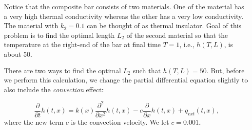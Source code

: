 \documentclass[11pt,a4paper]{article}
\newcommand{\p}{\partial }
\begin{document}
\noindent Notice that the composite bar consists of two materials. One of the material has a very high thermal conductivity whereas the other has a very low conductivity. The material with $k_2 = 0.1$ can be thought of as thermal insulator. Goal of this problem is to find the optimal length $L_2$ of the second material so that the temperature at the right-end of the bar at final time $T = 1$, i.e., $h(T, L)$, is about $50$. 

There are two ways to find the optimal $L_2$ such that $h(T, L) = 50$. But, before we perform this calculation, we change the partial differential equation slightly to also include the {\it convection} effect:

\begin{equation}\label{eq:pde2}
\frac{\p}{\p t} h(t, x) = k(x) \frac{\p^2 }{\p x^2} h(t, x) - c \frac{\p }{\p x} h(t, x) + q_{ext}(t, x),
\end{equation}
where the new term $c$ is the convection velocity. We let $c = 0.001$. 
\end{document}
